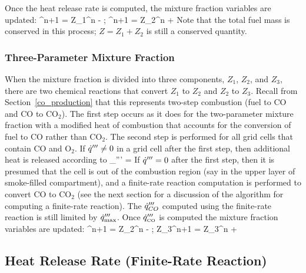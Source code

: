 \documentclass[11pt]{book}
\begin{document}
Once the heat release rate is computed, the mixture fraction variables are updated:
^{n+1} = {Z_1}^n -   \quad ; ^{n+1} =
{Z_2}^n +  \ee
Note that the total fuel mass is conserved in this process; $Z=Z_1+Z_2$ is still a conserved quantity.


\subsubsection{Three-Parameter Mixture Fraction}

When the mixture fraction is divided into three components, $Z_1$, $Z_2$, and $Z_3$, there are two chemical
reactions that convert $Z_1$ to $Z_2$ and $Z_2$ to $Z_3$.  Recall from Section~\ref{co_production}
that this represents two-step combustion (fuel to CO and CO to CO$_2$).
The first step occurs as it does for the two-parameter mixture fraction with a modified heat of combustion that
accounts for the conversion of fuel to CO rather than CO$_2$.
The second step is performed for all grid cells that contain CO and O$_2$.   If $\dot{q}''' \neq 0$ in a grid
cell after the first step, then additional heat is released according to
\be \dq_{\CO}''' = \min {}     \ee
If $\dot{q}'''=0$ after the first step, then it is presumed that the cell is out of the combustion region (say in the upper layer of
smoke-filled compartment), and a finite-rate reaction computation is performed to convert CO to CO$_2$ (see the next section for
a discussion of the algorithm for computing a finite-rate reaction).  The $\dot{q}'''_{CO}$ computed using the finite-rate
reaction is still limited by $\dot{q}_{\max}'''$.  Once $\dot{q}'''_{{\tiny \hbox{CO}}}$ is computed the mixture fraction variables are updated:
^{n+1} = {Z_2}^n -  \quad ; \quad
{Z_3}^{n+1} = {Z_3}^n +  \ee




\subsection{Heat Release Rate (Finite-Rate Reaction)}
\end{document}
